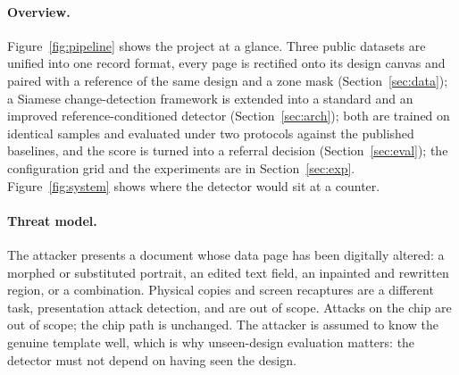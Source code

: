 \documentclass[11pt,a4paper]{article}
\begin{document}
\paragraph{Overview.} Figure~\ref{fig:pipeline} shows the project at a glance. Three public datasets are unified into one record format, every page is rectified onto its design canvas and paired with a reference of the same design and a zone mask (Section~\ref{sec:data}); a Siamese change-detection framework is extended into a standard and an improved reference-conditioned detector (Section~\ref{sec:arch}); both are trained on identical samples and evaluated under two protocols against the published baselines, and the score is turned into a referral decision (Section~\ref{sec:eval}); the configuration grid and the experiments are in Section~\ref{sec:exp}. Figure~\ref{fig:system} shows where the detector would sit at a counter.

\paragraph{Threat model.} The attacker presents a document whose data page has been digitally altered: a morphed or substituted portrait, an edited text field, an inpainted and rewritten region, or a combination. Physical copies and screen recaptures are a different task, presentation attack detection, and are out of scope. Attacks on the chip are out of scope; the chip path is unchanged. The attacker is assumed to know the genuine template well, which is why unseen-design evaluation matters: the detector must not depend on having seen the design.
\end{document}
